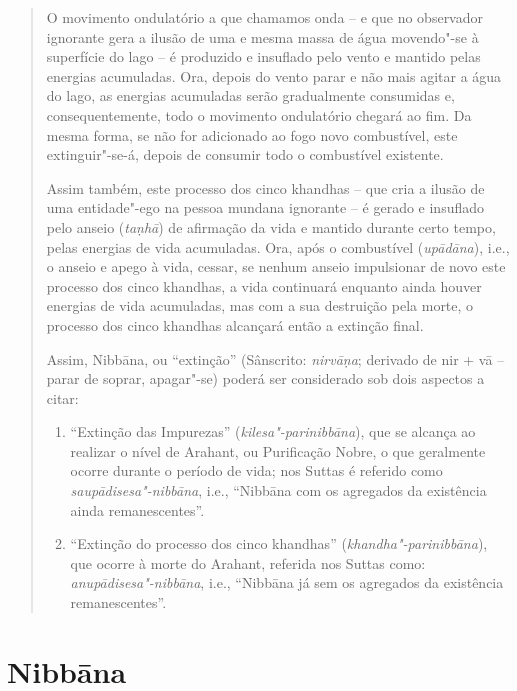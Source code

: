 \begin{quote}
  O movimento ondulatório a que chamamos onda -- e que no observador ignorante
  gera a ilusão de uma e mesma massa de água movendo"-se à superfície do lago --
  é produzido e insuflado pelo vento e mantido pelas energias acumuladas. Ora,
  depois do vento parar e não mais agitar a água do lago, as energias acumuladas
  serão gradualmente consumidas e, consequentemente, todo o movimento
  ondulatório chegará ao fim. Da mesma forma, se não for adicionado ao fogo novo
  combustível, este extinguir"-se-á, depois de consumir todo o combustível
  existente.

  Assim também, este processo dos cinco khandhas -- que cria a ilusão de uma
  entidade"-ego na pessoa mundana ignorante -- é gerado e insuflado pelo anseio
  (\emph{ta\d{n}hā}) de afirmação da vida e mantido durante certo tempo, pelas energias de
  vida acumuladas. Ora, após o combustível (\emph{upādāna}), i.e., o anseio e
  apego à vida, cessar, se nenhum anseio impulsionar de novo este processo dos
  cinco khandhas, a vida continuará enquanto ainda houver energias de vida
  acumuladas, mas com a sua destruição pela morte, o processo dos cinco khandhas
  alcançará então a extinção final.

  Assim, Nibbāna, ou “extinção” (Sânscrito: \emph{nirvā\d{n}a}; derivado de nir +
  vā -- parar de soprar, apagar"-se) poderá ser considerado sob dois aspectos a
  citar:

  \begin{enumerate}

    \item “Extinção das Impurezas” (\emph{kilesa"-parinibbāna}), que se
          alcança ao realizar o nível de Arahant, ou Purificação Nobre, o que
          geralmente ocorre durante o período de vida; nos Suttas é referido
          como \emph{saupādisesa"-nibbāna}, i.e., “Nibbāna com os agregados da
          existência ainda remanescentes”.

    \item “Extinção do processo dos cinco khandhas”
          (\emph{khandha"-parinibbāna}), que ocorre à morte do Arahant, referida
          nos Suttas como: \emph{anupādisesa"-nibbāna}, i.e., “Nibbāna já sem os
          agregados da existência remanescentes”.

  \end{enumerate}
\end{quote}

\section{Nibbāna}

